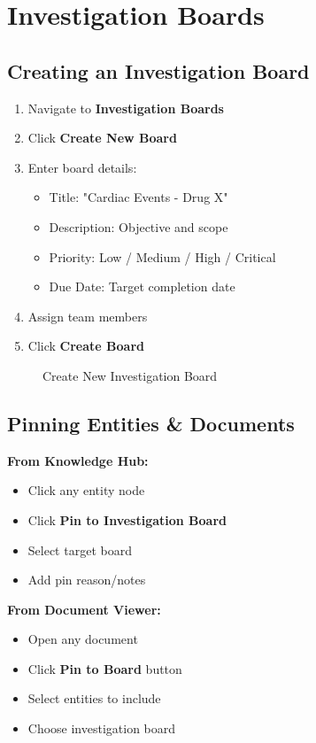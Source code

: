 \section{Investigation Boards}

\subsection{Creating an Investigation Board}

\begin{enumerate}
    \item Navigate to \textbf{Investigation Boards}
    \item Click \textbf{Create New Board}
    \item Enter board details:
    \begin{itemize}
        \item Title: "Cardiac Events - Drug X"
        \item Description: Objective and scope
        \item Priority: Low / Medium / High / Critical
        \item Due Date: Target completion date
    \end{itemize}
    \item Assign team members
    \item Click \textbf{Create Board}
\end{enumerate}

\begin{figure}[h]
\centering
{}
\caption{Create New Investigation Board}
\label{fig:create-board}
\end{figure}

\subsection{Pinning Entities \& Documents}

\textbf{From Knowledge Hub:}
\begin{itemize}
    \item Click any entity node
    \item Click \textbf{Pin to Investigation Board}
    \item Select target board
    \item Add pin reason/notes
\end{itemize}

\textbf{From Document Viewer:}
\begin{itemize}
    \item Open any document
    \item Click \textbf{Pin to Board} button
    \item Select entities to include
    \item Choose investigation board
\end{itemize}

